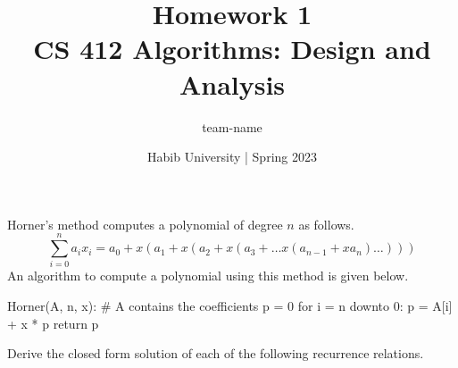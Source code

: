 \documentclass[addpoints]{exam}
\title{Homework 1\\ CS 412 Algorithms: Design and Analysis}
\author{team-name}  %
\date{Habib University | Spring 2023}
\begin{document}
\maketitle

\begin{questions}

  \question
  Horner's method computes a polynomial of degree $n$ as follows.
  \[
    \sum_{i=0}^n a_ix_i = a_0 + x(a_1 + x(a_2 + x(a_3 + \ldots x(a_{n-1}+xa_n)\ldots)) )
  \]
  An algorithm to compute a polynomial using this method is given below.
\begin{python}
Horner(A, n, x):
  # A contains the coefficients
  p = 0
  for i = n downto 0:
    p = A[i] + x * p
  return p
\end{python}

  \begin{solution}
    \begin{parts}
      \part 
      \part 
    \end{parts}
  \end{solution}

  \question Derive the closed form solution of each of the following recurrence relations.


\end{questions}
\end{document}

